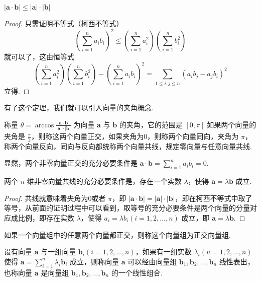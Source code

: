 \begin{theorem}
  $| \bm{a} \cdot \bm{b} | \leqslant | \bm{a} | \cdot |
  \bm{b} |$
\end{theorem}

\begin{proof}
  只需证明不等式（柯西不等式）
  \[ \left( \sum_{i = 1}^n a_i b_i \right)^2 \leqslant \left( \sum_{i = 1}^n
     a_i^2 \right) \left( \sum_{i = 1}^n b_i^2 \right) \]
  就可以了，这由恒等式
  \[ \left( \sum_{i = 1}^n a_i^2 \right) \left( \sum_{i = 1}^n b_i^2 \right) -
     \left( \sum_{i = 1}^n a_i b_i \right)^2 = \sum_{1 \leqslant i, j
     \leqslant n} (a_i b_j - a_j b_i)^2 \]
  立得.
\end{proof}

有了这个定理，我们就可以引入向量的夹角概念.

\begin{definition}
  称量 $\theta = \arccos \frac{\bm{a} \cdot \bm{b}}{|
  \bm{a} | \cdot | \bm{b} |}$ 为向量 $\bm{a}$ 与
  $\bm{b}$ 的夹角，它的范围是 $[0,
  \pi]$.如果两个向量的夹角是
  $\frac{\pi}{2}$，则称这两个向量正交，如果夹角为0，则称两个向量同向，夹角为
  $\pi$，称两个向量反向，同向与反向都统称两个向量共线，规定零向量与任意向量共线.
\end{definition}

显然，两个非零向量正交的充分必要条件是 $\bm{a} \cdot
\bm{b}= \sum_{i = 1}^n a_i b_i = 0$.

\begin{theorem}
  两个 $n$
  维非零向量共线的充分必要条件是，存在一个实数
  $\lambda$，使得 $\bm{a}= \lambda \bm{b}$ 成立.
\end{theorem}

\begin{proof}
  共线就意味着夹角为0或者 $\pi$，即 $| \bm{a} \cdot
  \bm{b} | = | \bm{a} | \cdot | \bm{b}
  |$，即在柯西不等式中取了等号，从前面的证明过程中可以看到，取等号的充分必要条件是两个向量的分量对应成比例，即存在实数
  $\lambda$，使得 $a_i = \lambda b_i (i = 1, 2, \ldots, n)$ 成立，即
  $\bm{a}= \lambda \bm{b}$.
\end{proof}

\begin{definition}
  如果一个向量组中的任意两个向量都正交，则称这个向量组为正交向量组.
\end{definition}

\begin{definition}
  设有向量 $\bm{a}$ 与一组向量 $\bm{b}_i (i = 1, 2,
  \ldots, n)$，如果有一组实数 $\lambda_i (u = 1, 2, \ldots, n)$ 使得
  $\bm{a}= \sum_{i = 1}^n \lambda_i \bm{b}_i$
  成立，则称向量 $\bm{a}$ 可以经由向量组 $\bm{b}_1,
  \bm{b}_2, \ldots, \bm{b}_n$ 线性表出，也称向量
  $\bm{a}$ 是向量组 $\bm{b}_1, \bm{b}_2, \ldots,
  \bm{b}_n$ 的一个线性组合.
\end{definition}

